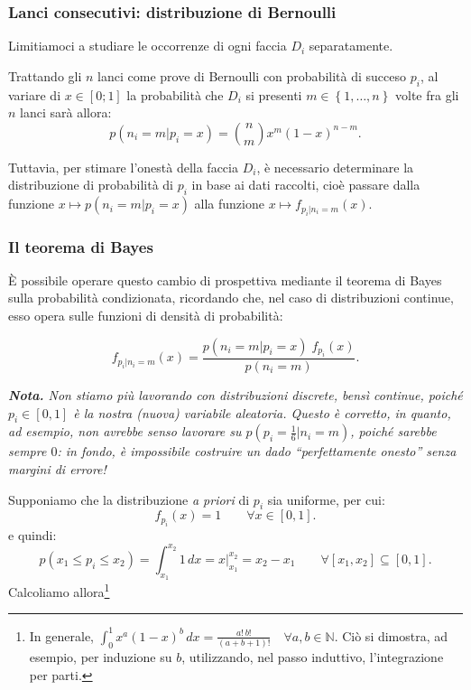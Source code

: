 \documentclass{article}
\begin{document}
\begin{appendices}
\subsubsection{Lanci consecutivi: distribuzione di Bernoulli}

Limitiamoci a studiare le occorrenze di ogni faccia $D_i$ separatamente.

Trattando gli $n$ lanci come prove di Bernoulli con probabilità di succeso $p_i$, al variare di
$x\in\left[0;1\right]$ la probabilità che $D_i$ si presenti
$m\in\left\{1,\dots,n\right\}$ volte fra gli $n$ lanci sarà allora:
\[p(n_i=m|p_i=x) = \binom{n}{m} x^m (1-x)^{n - m}.\]

Tuttavia, per stimare l'onestà della faccia $D_i$, è necessario determinare la distribuzione di
probabilità di $p_i$ in base ai dati raccolti, cioè passare dalla funzione
$x\longmapsto p(n_i=m|p_i=x)$ alla funzione $x\longmapsto f_{p_i|n_i=m}(x)$.

\subsubsection{Il teorema di Bayes}
È possibile operare questo cambio di prospettiva mediante il teorema di Bayes sulla probabilità
condizionata, ricordando che, nel caso di distribuzioni continue, esso opera sulle funzioni di
densità di probabilità:

\[f_{p_i|n_i=m}(x) = \frac{p(n_i=m|p_i=x)\;f_{p_i}(x)}{p(n_i=m)}.\]

\emph{
    \textbf{Nota.} Non stiamo più lavorando con distribuzioni discrete, bensì continue,
    poiché $p_i \in \left[0,1\right]$ è la nostra (nuova) variabile aleatoria.
    Questo è corretto, in quanto, ad esempio, non avrebbe senso lavorare su
    $p(p_i = \frac{1}{6}|n_i=m)$, poiché sarebbe sempre $0$: in fondo, è impossibile
    costruire un dado “perfettamente onesto” senza margini di errore!
}

Supponiamo che la distribuzione \emph{a priori} di $p_i$ sia uniforme, per cui:
\[f_{p_i}(x) = 1\qquad\forall x\in \left[0,1\right].\]
e quindi:
\[p(x_1\le p_i\le x_2) = \int_{x_1}^{x_2}1\,dx = x\Big|_{x_1}^{x_2}=x_2-x_1
\qquad\forall \left[x_1,x_2\right]\subseteq \left[0,1\right].\]
Calcoliamo allora\footnote{
In generale, $\int_{0}^{1}x^a(1-x)^b\,dx = \frac{a!\,b!}{(a+b+1)!}\quad\forall a,b\in\mathbb{N}$.
Ciò si dimostra, ad esempio, per induzione su $b$, utilizzando, nel passo induttivo, l'integrazione
per parti.

}
\end{appendices}
\end{document}
